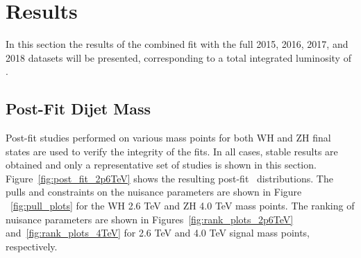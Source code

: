 \graphicspath{{Ch6_Results/figures/}}

\chapter{Results}
\label{ch:results}
In this section the results of the combined fit with the full 2015, 2016, 2017, and 2018 datasets will be presented, corresponding to a total integrated luminosity of \lumi.

\section{Post-Fit Dijet Mass}

Post-fit studies performed on various mass points for both WH and ZH final states are used to verify the integrity of the fits.
In all cases, stable results are obtained and only a representative set of studies is shown in this section.
Figure~\ref{fig:post_fit_2p6TeV} shows the resulting post-fit \mvh\ distributions.
The pulls and constraints on the nuisance parameters are shown in Figure ~\ref{fig:pull_plots} for the WH 2.6 TeV and ZH 4.0 TeV mass points.
The ranking of nuisance parameters are shown in Figures~\ref{fig:rank_plots_2p6TeV} and~\ref{fig:rank_plots_4TeV} for 2.6 TeV and 4.0 TeV signal mass points, respectively.

